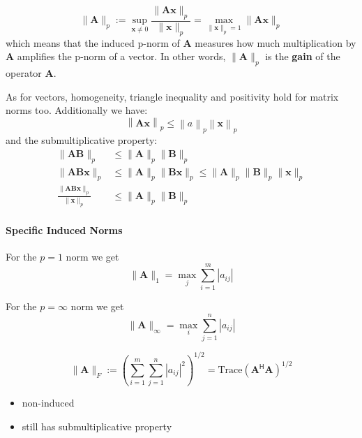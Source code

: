 \begin{equation*}
    \|\mathbf{A}\|_p:=\sup_{\mathbf{x}\neq0}\frac{\|\mathbf{Ax}\|_p}{\|\mathbf{x}\|_p}=\max_{\|\mathbf{x}\|_p=1}\|\mathbf{Ax}\|_p
\end{equation*}
which means that the induced p-norm of $\mathbf{A}$ measures how much multiplication by $\mathbf{A}$ amplifies the p-norm of a vector. In other words, $\|\mathbf{A}\|_p$ is the \textbf{gain} of the operator $\mathbf{A}$.

\newpar{}

As for vectors, homogeneity, triangle inequality and positivity hold for matrix norms too. Additionally we have:
\begin{equation*}
    \left\|\mathbf{Ax}\right\|_p\leq\left\|a\right\|_p\left\|\mathbf{x}\right\|_p
\end{equation*}
and the submultiplicative property:
\begin{align*}
    \|\mathbf{AB}\|_p                                     & \leq\|\mathbf{A}\|_p\|\mathbf{B}\|_p                                                      \\
    \|\mathbf{AB} \mathbf{x}\|_p                          & \leq\|\mathbf{A}\|_p\|\mathbf{Bx}\|_p\leq\|\mathbf{A}\|_p\|\mathbf{B}\|_p\|\mathbf{x}\|_p \\
    \frac{\|\mathbf{AB} \mathbf{x}\|_p}{\|\mathbf{x}\|_p} & \leq\|\mathbf{A}\|_p\|\mathbf{B}\|_p
\end{align*}


\paragraph{Specific Induced Norms}

For the $p = 1$ norm we get
\begin{equation*}
    \|\mathbf{A}\|_1=\max_j\sum_{i=1}^m|a_{ij}|
\end{equation*}

For the $p = \infty$ norm we get
\begin{equation*}
    \|\mathbf{A}\|_\infty=\max_i\sum_{j=1}^n|a_{ij}|
\end{equation*}


\begin{equation*}
    \|\mathbf{A}\|_F:={\left(\sum_{i=1}^m\sum_{j=1}^n|a_{ij}|^2\right)}^{1/2}=\text{Trace}{(\mathbf{A}^{\mathsf{H}}\mathbf{A})}^{1/2}
\end{equation*}

\begin{itemize}
    \item non-induced
    \item still has submultiplicative property
\end{itemize}
